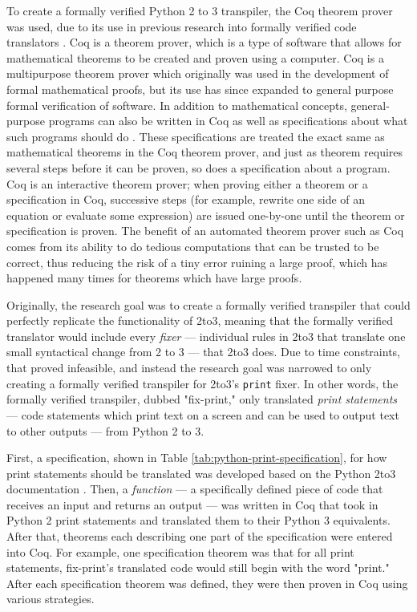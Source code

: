 To create a formally verified Python 2 to 3 transpiler, the Coq theorem prover was used, due to its use in previous research into formally verified code translators \autocite{Leroy}\autocite{Zhao}. Coq is a theorem prover, which is a type of software that allows for mathematical theorems to be created and proven using a computer. Coq is a multipurpose theorem prover which originally was used in the development of formal mathematical proofs, but its use has since expanded to general purpose formal verification of software. In addition to mathematical concepts, general-purpose programs can also be written in Coq as well as specifications about what such programs should do \autocite{Coq}. These specifications are treated the exact same as mathematical theorems in the Coq theorem prover, and just as theorem requires several steps before it can be proven, so does a specification about a program. Coq is an interactive theorem prover; when proving either a theorem or a specification in Coq, successive steps (for example, rewrite one side of an equation or evaluate some expression) are issued one-by-one until the theorem or specification is proven. The benefit of an automated theorem prover such as Coq comes from its ability to do tedious computations that can be trusted to be correct, thus reducing the risk of a tiny error ruining a large proof, which has happened many times for theorems which have large proofs.

Originally, the research goal was to create a formally verified transpiler that could perfectly replicate the functionality of 2to3, meaning that the formally verified translator would include every \textit{fixer} --- individual rules in 2to3 that translate one small syntactical change from 2 to 3 --- that 2to3 does. Due to time constraints, that proved infeasible, and instead the research goal was narrowed to only creating a formally verified transpiler for 2to3's \verb|print| fixer. In other words, the formally verified transpiler, dubbed "fix-print," only translated \textit{print statements} --- code statements which print text on a screen and can be used to output text to other outputs --- from Python 2 to 3.

First, a specification, shown in Table \ref{tab:python-print-specification}, for how print statements should be translated was developed based on the Python 2to3 documentation \autocite{2to3}. Then, a \textit{function} --- a specifically defined piece of code that receives an input and returns an output ---  was written in Coq that took in Python 2 print statements and translated them to their Python 3 equivalents. After that, theorems each describing one part of the specification were entered into Coq. For example, one specification theorem was that for all print statements, fix-print's translated code would still begin with the word "print." After each specification theorem was defined, they were then proven in Coq using various strategies.

